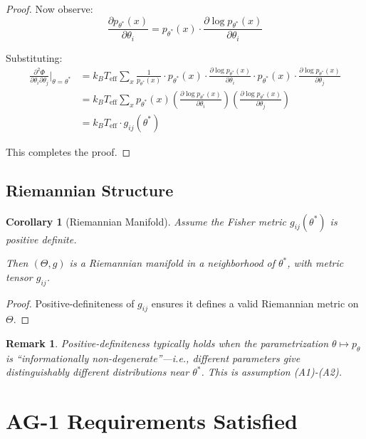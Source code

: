 \documentclass[11pt]{article}
\newtheorem{corollary}[theorem]{Corollary}
\newtheorem{remark}[theorem]{Remark}
\begin{document}
\begin{proof}
Now observe:
\begin{equation}
\frac{\partial p_{\theta^*}(x)}{\partial \theta_i} = p_{\theta^*}(x) \cdot \frac{\partial \log p_{\theta^*}(x)}{\partial \theta_i}
\end{equation}

Substituting:
\begin{align}
\frac{\partial^2 \Phi}{\partial \theta_i \partial \theta_j} \bigg|_{\theta = \theta^*}
&= k_B T_{\text{eff}} \sum_{x} \frac{1}{p_{\theta^*}(x)} \cdot p_{\theta^*}(x) \cdot \frac{\partial \log p_{\theta^*}(x)}{\partial \theta_i} \cdot p_{\theta^*}(x) \cdot \frac{\partial \log p_{\theta^*}(x)}{\partial \theta_j} \nonumber \\
&= k_B T_{\text{eff}} \sum_{x} p_{\theta^*}(x) \left( \frac{\partial \log p_{\theta^*}(x)}{\partial \theta_i} \right) \left( \frac{\partial \log p_{\theta^*}(x)}{\partial \theta_j} \right) \nonumber \\
&= k_B T_{\text{eff}} \cdot g_{ij}(\theta^*)
\end{align}

This completes the proof.
\end{proof}

\subsection{Riemannian Structure}

\begin{corollary}[Riemannian Manifold]
\label{cor:riemannian}
Assume the Fisher metric $g_{ij}(\theta^*)$ is positive definite.

Then $(\Theta, g)$ is a Riemannian manifold in a neighborhood of $\theta^*$, with metric tensor $g_{ij}$.
\end{corollary}

\begin{proof}
Positive-definiteness of $g_{ij}$ ensures it defines a valid Riemannian metric on $\Theta$.
\end{proof}

\begin{remark}
Positive-definiteness typically holds when the parametrization $\theta \mapsto p_\theta$ is ``informationally non-degenerate''---i.e., different parameters give distinguishably different distributions near $\theta^*$. This is assumption (A1)-(A2).
\end{remark}

\section{AG-1 Requirements Satisfied}
\end{document}
